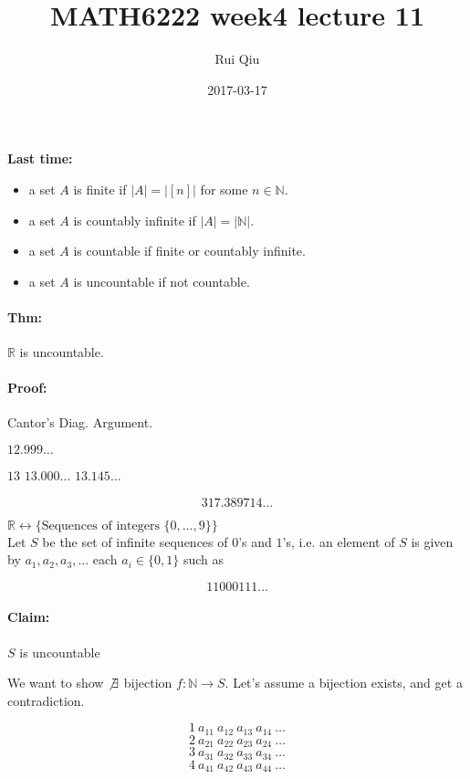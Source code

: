 \documentclass[a4paper, 11pt, twoside]{article}
\begin{document}
\title{MATH6222 week4 lecture 11}
\author{Rui Qiu}
\date{2017-03-17}

\maketitle

\textbf{Last time:}\\

\begin{itemize}
	\item a set $A$ is finite if $|A|=|[n]|$ for some $n\in\mathbb{N}$.
	\item a set $A$ is countably infinite if $|A|=|\mathbb{N}|$.
	\item a set $A$ is countable if finite or countably infinite.
	\item a set $A$ is uncountable if not countable.
\end{itemize}

\paragraph{Thm:} $\mathbb{R}$ is uncountable.

\paragraph{Proof:} Cantor's Diag. Argument.

$12.999\dots$

$13$
$13.000\dots$
$13.145\dots$

\[317.389714\dots\]

$\mathbb{R}\longleftrightarrow\{\text{Sequences of integers } \{0, \dots, 9\}\}$\\

Let $S$ be the set of infinite sequences of $0$'s and $1$'s, i.e. an element of $S$ is given by $a_1, a_2, a_3,\dots$ each $a_i\in\{0,1\}$ such as 

\[11000111\dots\]

\paragraph{Claim:} $S$ is uncountable

We want to show $\not\exists$ bijection $f:\mathbb{N}\to S$. Let's assume a bijection exists, and get a contradiction.


\[1\ a_{11}\ a_{12}\ a_{13}\ a_{14}\ \dots\]
\[2\ a_{21}\ a_{22}\ a_{23}\ a_{24}\ \dots\]
\[3\ a_{31}\ a_{32}\ a_{33}\ a_{34}\ \dots\]
\[4\ a_{41}\ a_{42}\ a_{43}\ a_{44}\ \dots\]
\end{document}
